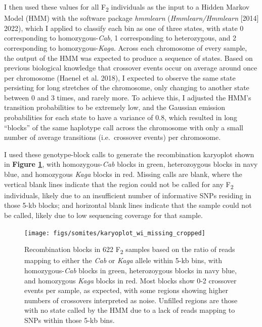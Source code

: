 \documentclass[
]{book}
\begin{document}
I then used these values for all F\textsubscript{2} individuals as the input to a Hidden Markov Model (HMM) with the software package \emph{hmmlearn} (\emph{Hmmlearn/Hmmlearn} {[}2014{]} 2022), which I applied to classify each bin as one of three states, with state 0 corresponding to homozygous-\emph{Cab}, 1 corresponding to heterozygous, and 2 corresponding to homozygous-\emph{Kaga}. Across each chromosome of every sample, the output of the HMM was expected to produce a sequence of states. Based on previous biological knowledge that crossover events occur on average around once per chromosome (Haenel et al. 2018), I expected to observe the same state persisting for long stretches of the chromosome, only changing to another state between 0 and 3 times, and rarely more. To achieve this, I adjusted the HMM's transition probabilities to be extremely low, and the Gaussian emission probabilities for each state to have a variance of 0.8, which resulted in long ``blocks'' of the same haplotype call across the chromosome with only a small number of average transitions (i.e.~crossover events) per chromosome.

\clearpage

I used these genotype-block calls to generate the recombination karyoplot shown in \textbf{Figure \ref{fig:karyo-wi-missing}}, with homozygous-\emph{Cab} blocks in green, heterozoygous blocks in navy blue, and homozygous \emph{Kaga} blocks in red. Missing calls are blank, where the vertical blank lines indicate that the region could not be called for any F\textsubscript{2} individuals, likely due to an insufficient number of informative SNPs residing in those 5-kb blocks; and horizontal blank lines indicate that the sample could not be called, likely due to low sequencing coverage for that sample.



\begin{figure}

{\centering \texttt{[image: figs/somites/karyoplot\_wi\_missing\_cropped]} 

}

\caption{Recombination blocks in 622 F\textsubscript{2} samples based on the ratio of reads mapping to either the \emph{Cab} or \emph{Kaga} allele within 5-kb bins, with homozygous-\emph{Cab} blocks in green, heterozoygous blocks in navy blue, and homozygous \emph{Kaga} blocks in red. Most blocks show 0-2 crossover events per sample, as expected, with some regions showing higher numbers of crossovers interpreted as noise. Unfilled regions are those with no state called by the HMM due to a lack of reads mapping to SNPs within those 5-kb bins.}\label{fig:karyo-wi-missing}
\end{figure}
\end{document}
